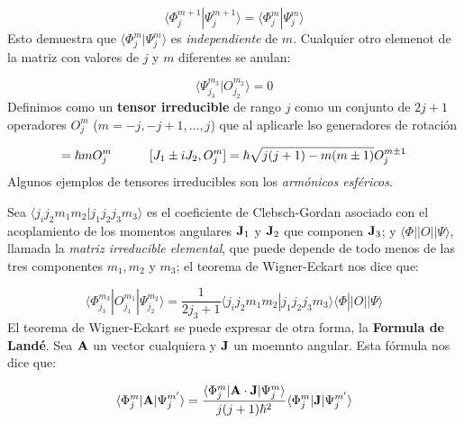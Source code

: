 \begin{equation}
    \langle \Phi_j^{m+1} | \Psi_j^{m+1} \rangle = \langle \Phi_j^m |\Psi_j^m \rangle
\end{equation}
Esto demuestra que $\langle \Phi_j^m |\Psi_j^m \rangle$ es {\it independiente} de $m$. Cualquier otro elemenot de la matriz con valores de $j$ y $m$ diferentes se anulan:

\begin{equation}
    \langle \Psi_{j_3}^{m_3} | O_{j_2}^{m_2} \rangle = 0
\end{equation}
Definimos como un {\bf tensor irreducible} de rango $j$ como un conjunto de $2j+1$ operadores $O_{j}^m$  ($m=-j,-j+1,...,j$) que al aplicarle lso generadores de rotación

\begin{equation}
    [J_3,O_j^m] = \hbar m O_j^m \tquad [J_1\pm i J_2, O_j^m] = \hbar \sqrt{j(j+1)-m(m\pm 1)} O_{j}^{m\pm 1}
\end{equation}
Algunos ejemplos de tensores irreducibles son los {\it armónicos esféricos}. 

\begin{theorem}
    Sea $\langle j_i j_2 m_1 m_2 |j_1 j_2 j_3 m_3 \rangle$ es el coeficiente de Clebsch-Gordan asociado con el acoplamiento de los momentos angulares $\mathbf{J}_1$ y $\mathbf{J}_2$ que componen $\mathbf{J}_3$; y $\langle \Phi || O || \Psi\rangle$, llamada la {\it matriz irreducible elemental}, que puede depende de todo menos de las tres componentes $m_1,m_2$ y $m_3$; el teorema de Wigner-Eckart nos dice que:

    \begin{equation}
        \langle \Phi_{j_3}^{m_3} | O_{j_1}^{m_1} |\Psi_{j_2}^{m_2} \rangle = \frac{1}{2j_3+1} \langle  j_i j_2 m_1 m_2 | j_1 j_2 j_3 m_3 \rangle \langle \Phi || O || \Psi  \rangle
    \end{equation}
    El teorema de Wigner-Eckart se puede expresar de otra forma, la {\bf Formula de Landé}. Sea $\mathbf{A}$ un vector cualquiera y $\mathbf{J}$ un moemnto angular. Esta fórmula nos dice que:

    \begin{equation}
        \langle \Phi_{j}^{m} | \mathbf{A} |\Psi_{j}^{m'} \rangle = \frac{\langle \Phi_j^m |\mathbf{A} \cdot \mathbf{J} | \Psi_j^m\rangle }{j(j+1)\hbar^2} \langle \Phi_j^m | \mathbf{J}| \Psi_j^{m'}  \rangle
    \end{equation}
    
\end{theorem}